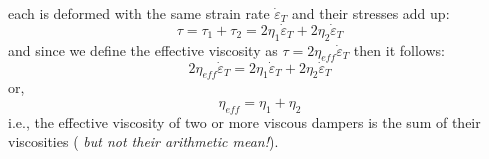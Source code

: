 
\begin{center}

\end{center}
 
each is deformed with the same strain rate $\dot{\varepsilon}_T$
and their stresses add up:
\[
\tau = \tau_1 + \tau_2 = 2 \eta_1 \dot{\varepsilon}_T  + 2 \eta_2 \dot{\varepsilon}_T
\]
and since we define the effective viscosity as $\tau = 2 \eta_{eff} \dot{\varepsilon}_T$ then it follows:
\[
2 \eta_{eff} \dot{\varepsilon}_T = 2 \eta_1 \dot{\varepsilon}_T  + 2 \eta_2 \dot{\varepsilon}_T
\]
or, 
\[
\eta_{eff} = \eta_1 + \eta_2 
\]
i.e., the effective viscosity of two or more viscous dampers is the sum of their viscosities ({\sl 
but not their arithmetic mean!}).

